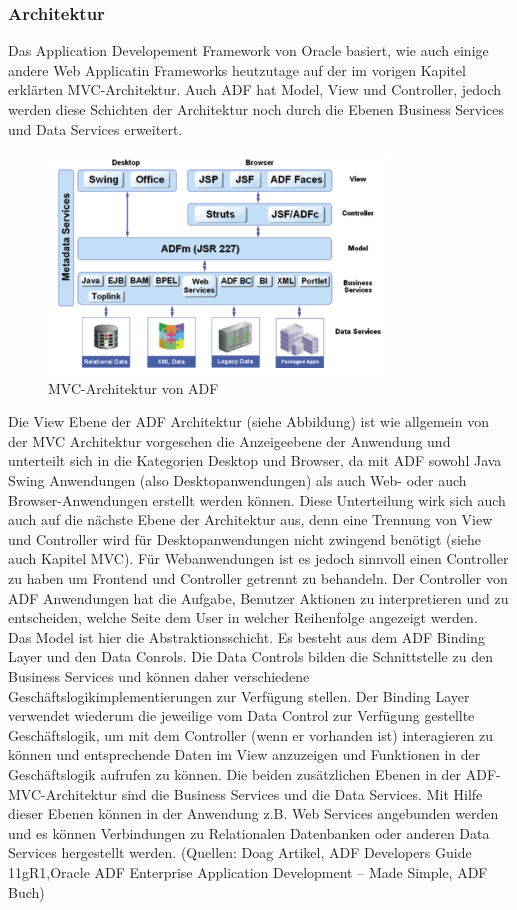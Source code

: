 \subsubsection{Architektur}
Das Application Developement Framework von Oracle basiert, wie auch einige andere Web Applicatin Frameworks heutzutage auf der im vorigen Kapitel erklärten MVC-Architektur. 
Auch ADF hat Model, View und Controller, jedoch werden diese Schichten der Architektur noch durch die Ebenen Business Services und Data Services erweitert.
\begin{figure}[H]
\centering
\includegraphics[width=0.80\textwidth]{img/MVC-ADF3.png}
\caption {MVC-Architektur von ADF}
\end{figure}

Die View Ebene der ADF Architektur (siehe Abbildung) ist wie allgemein von der MVC Architektur vorgesehen die Anzeigeebene der Anwendung und unterteilt sich in die Kategorien Desktop und Browser, da mit ADF sowohl Java Swing Anwendungen (also Desktopanwendungen) als auch Web- oder auch Browser-Anwendungen erstellt werden können. Diese Unterteilung wirk sich auch auch auf die nächste Ebene der Architektur aus, denn eine Trennung von View und Controller wird für Desktopanwendungen nicht zwingend benötigt (siehe auch Kapitel MVC). Für Webanwendungen ist es jedoch sinnvoll einen Controller zu haben um Frontend und Controller getrennt zu behandeln. Der Controller von ADF Anwendungen hat die Aufgabe, Benutzer Aktionen zu interpretieren und zu entscheiden, welche Seite dem User in welcher Reihenfolge angezeigt werden.\\
Das Model ist hier die Abstraktionsschicht. Es besteht aus dem ADF Binding Layer und den Data Conrols. Die Data Controls bilden die Schnittstelle zu den Business Services und können daher verschiedene Geschäftslogikimplementierungen zur Verfügung stellen. Der Binding Layer verwendet wiederum die jeweilige vom Data Control zur Verfügung gestellte Geschäftslogik, um mit dem Controller (wenn er vorhanden ist) interagieren zu können und entsprechende Daten im View anzuzeigen und Funktionen in der Geschäftslogik aufrufen zu können.
Die beiden zusätzlichen Ebenen in der ADF-MVC-Architektur sind die Business Services und die Data Services. Mit Hilfe dieser Ebenen können in der Anwendung z.B. Web Services angebunden werden und es können Verbindungen zu Relationalen Datenbanken oder anderen Data Services hergestellt werden.
(Quellen: Doag Artikel, ADF Developers Guide 11gR1,Oracle ADF Enterprise Application Development – Made Simple, ADF Buch)

